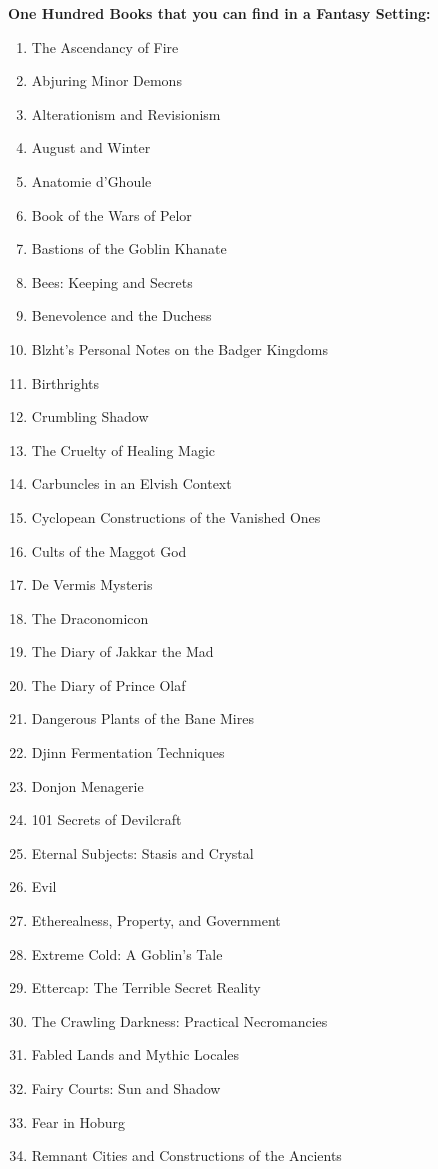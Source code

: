\textbf{One Hundred Books that you can find in a Fantasy Setting:}
\begin{enumerate}
	\topsep=0pt
	\itemsep=-2pt
	\item The Ascendancy of Fire
	\item Abjuring Minor Demons
	\item Alterationism and Revisionism
	\item August and Winter
	\item Anatomie d'Ghoule
	\item Book of the Wars of Pelor
	\item Bastions of the Goblin Khanate
	\item Bees: Keeping and Secrets
	\item Benevolence and the Duchess
	\item Blzht's Personal Notes on the Badger Kingdoms
	\item Birthrights
	\item Crumbling Shadow
	\item The Cruelty of Healing Magic
	\item Carbuncles in an Elvish Context
	\item Cyclopean Constructions of the Vanished Ones
	\item Cults of the Maggot God
	\item De Vermis Mysteris
	\item The Draconomicon
	\item The Diary of Jakkar the Mad
	\item The Diary of Prince Olaf
	\item Dangerous Plants of the Bane Mires
	\item Djinn Fermentation Techniques
	\item Donjon Menagerie
	\item 101 Secrets of Devilcraft
	\item Eternal Subjects: Stasis and Crystal
	\item Evil
	\item Etherealness, Property, and Government
	\item Extreme Cold: A Goblin's Tale
	\item Ettercap: The Terrible Secret Reality
	\item The Crawling Darkness: Practical Necromancies
	\item Fabled Lands and Mythic Locales
	\item Fairy Courts: Sun and Shadow
	\item Fear in Hoburg
	\item Remnant Cities and Constructions of the Ancients

\end{enumerate}
